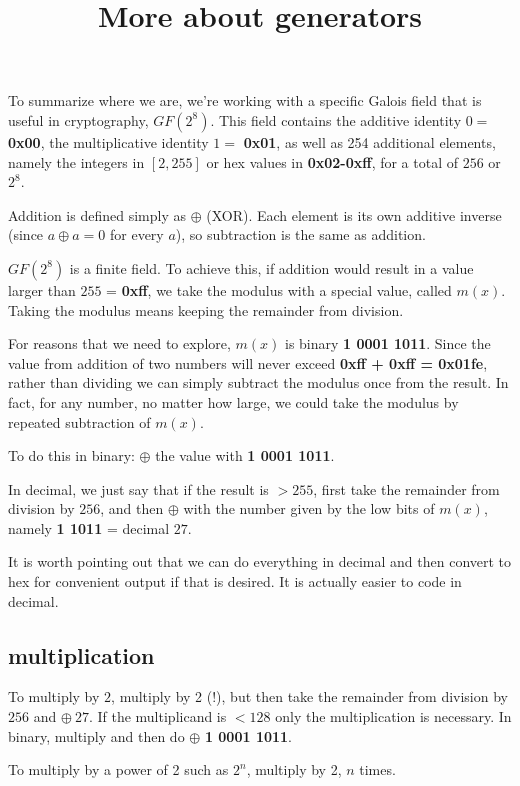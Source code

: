 \documentclass[11pt, oneside]{article}
\title{More about generators}
\date{}
\begin{document}
\maketitle

\large
To summarize where we are, we're working with a specific Galois field that is useful in cryptography, $GF(2^8)$.  This field contains the additive identity $0 =$ \textbf{0x00}, the multiplicative identity $1 =$ \textbf{0x01}, as well as 254 additional elements, namely the integers in $[2,255]$ or hex values in \textbf{0x02-0xff}, for a total of $256$ or $2^8$.

Addition is defined simply as $\oplus$ (XOR).  Each element is its own additive inverse (since $a \oplus a = 0$ for every $a$), so subtraction is the same as addition.

$GF(2^8)$ is a finite field.  To achieve this, if addition would result in a value larger than $255$ = \textbf{0xff}, we take the modulus with a special value, called $m(x)$.  Taking the modulus means keeping the remainder from division.

For reasons that we need to explore, $m(x)$ is binary \textbf{1 0001 1011}.  Since the value from addition of two numbers will never exceed \textbf{0xff + 0xff = 0x01fe}, rather than dividing we can simply subtract the modulus once from the result.  In fact, for any number, no matter how large, we could take the modulus by repeated subtraction of $m(x)$.

To do this in binary:  $\oplus$ the value with \textbf{1 0001 1011}.

In decimal, we just say that if the result is $> 255$, first take the remainder from division by $256$, and then $\oplus$ with the number given by the low bits of $m(x)$, namely \textbf{1 1011} = decimal $27$.

It is worth pointing out that we can do everything in decimal and then convert to hex for convenient output if that is desired.  It is actually easier to code in decimal.

\subsection*{multiplication}

To multiply by $2$, multiply by 2 (!), but then take the remainder from division by $256$ and $\oplus \ 27$.  If the multiplicand is $< 128$ only the multiplication is necessary.  In binary, multiply and then do $\oplus$ \textbf{1 0001 1011}.  

To multiply by a power of 2 such as $2^n$, multiply by 2, $n$ times.
\end{document}
